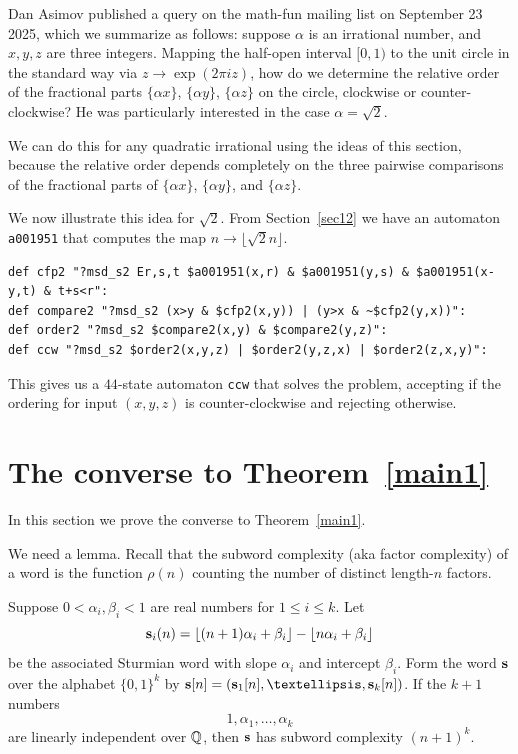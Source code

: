 \documentclass[12pt,reqno]{article}
\begin{document}
Dan Asimov published a query on the math-fun mailing
list on September 23 2025, which we summarize as follows:  suppose $\alpha$ is an irrational number,
and $x,y,z$ are three integers.  Mapping the half-open interval $[0,1)$
to the unit circle in the standard way via $z \rightarrow \exp(2\pi i z)$,
how do we determine the relative order of the fractional parts
$\{ \alpha x \}$,
$\{ \alpha y \}$,
$\{ \alpha z \}$ on the circle, clockwise or counter-clockwise?  He was
particularly interested in the case $\alpha = \sqrt{2}$.

We can do this for any quadratic irrational using the ideas of this section,
because the relative order depends completely on the three pairwise comparisons
of the fractional parts of $\{ \alpha x \}$,
$\{ \alpha y \}$, and
$\{ \alpha z \}$.

We now illustrate this idea for $\sqrt{2}$.  From Section~\ref{sec12}
we have an automaton {\tt a001951} that computes the map
$n \rightarrow \lfloor \sqrt{2} n \rfloor$.
\begin{verbatim}
def cfp2 "?msd_s2 Er,s,t $a001951(x,r) & $a001951(y,s) & $a001951(x-y,t) & t+s<r":
def compare2 "?msd_s2 (x>y & $cfp2(x,y)) | (y>x & ~$cfp2(y,x))":
def order2 "?msd_s2 $compare2(x,y) & $compare2(y,z)":
def ccw "?msd_s2 $order2(x,y,z) | $order2(y,z,x) | $order2(z,x,y)":
\end{verbatim}

This gives us a $44$-state automaton {\tt ccw} that solves the problem,
accepting if the ordering for input
$(x,y,z)$ is counter-clockwise and rejecting otherwise.

\section{The converse to Theorem~\ref{main1}}
\label{converse-sec}

In this section we prove the converse to Theorem~\ref{main1}.

We need a lemma.   Recall that the subword complexity (aka factor complexity) of a word is the function
$\rho(n)$ counting the number of distinct length-$n$ factors.
\begin{lemma}
Suppose $0 <\alpha_i, \beta_i < 1$
are real numbers for $1 \leq i \leq k$.  Let $${\bf s}_i (n) = 
\lfloor (n+1) \alpha_i + \beta_i \rfloor - \lfloor n \alpha_i + \beta_i \rfloor$$
be the associated Sturmian word
with slope $\alpha_i$ and
intercept $\beta_i$.
Form the word $\bf s$ over the alphabet
$\{ 0,1 \}^k$ by
${\bf s}[n] = ({\bf s}_1 [n],\ldots,
{\bf s}_k [n])$.  If the
$k+1$ numbers
$$1, \alpha_1, \ldots, \alpha_k$$
are linearly independent
over $\mathbb{Q}$, then
$\bf s$ has subword complexity
$(n+1)^k$.
\end{lemma}
\end{document}
